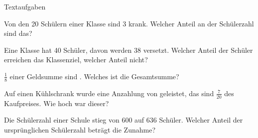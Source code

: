 \documentclass[12pt,a5paper,landscape]{scrartcl}
\begin{document}
	\begin{karte2}{Textaufgaben}
		\begin{enumeratea}
			\item Von den 20 Schülern einer Klasse sind 3 krank. Welcher Anteil an der Schülerzahl sind das?
			
			\item Eine Klasse hat 40 Schüler, davon werden 38 versetzt. Welcher Anteil der Schüler erreichen das Klassenziel, welcher Anteil nicht?
			
			\item $\tfrac{1}{8}$ einer Geldsumme sind . Welches ist die Gesamtsumme?
			
			\item Auf einen Kühlschrank wurde eine Anzahlung von  geleistet, das sind $\tfrac{7}{20}$ des Kaufpreises. Wie hoch war dieser?
			
			\item Die Schülerzahl einer Schule stieg von 600 auf 636 Schüler. Welcher Anteil der ursprünglichen Schülerzahl beträgt die Zunahme?
		\end{enumeratea}
	\end{karte2}
	
	\leereKarte
	
\end{document}
